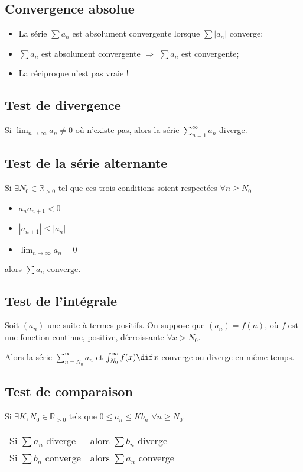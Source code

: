 \subsection{Convergence absolue}
\begin{itemize}
  \item
    La série $\sum a_n$ est absolument convergente
    lorsque $\sum |a_n|$ converge;
  \item
    $\sum a_n$ est absolument convergente
    $\Rightarrow$ $\sum a_n$ est convergente;
  \item
    La réciproque n'est pas vraie !
\end{itemize}

\subsection{Test de divergence}
Si $\lim_{n \to \infty}a_n \neq 0$ où n'existe pas,
alors la série $\sum_{n = 1}^{\infty}a_n$ diverge.

\subsection{Test de la série alternante}
Si $\exists N_0 \in \mathbb{R}_{> 0}$ tel que
ces trois conditions soient respectées
$\forall n \geq N_0$
\begin{itemize}
  \item $a_na_{n+1} < 0$
  \item $|a_{n+1}| \leq |a_{n}|$
  \item $\lim_{n\to\infty}a_n = 0$
\end{itemize}
alors $\sum a_n$ converge.

\subsection{Test de l'intégrale}
Soit $(a_n)$ une suite à termes positifs.
On suppose que $(a_n) = f(n)$, où $f$ est une fonction continue,
positive, décroissante $\forall x > N_0$.

Alors la série $\sum_{n =N_0}^{\infty} a_n$ et
$\int_{N_0}^{\infty} f(x) \dif x$ converge ou diverge en même temps.

\subsection{Test de comparaison}
Si $\exists K, N_0 \in \mathbb{R}_{> 0}$ tels que
$0 \leq a_n \leq Kb_n$ $\forall n \geq N_0$.
\begin{center}
  \begin{tabular}{ll}
    Si $\sum a_n$ diverge & alors $\sum b_n$ diverge\\
    Si $\sum b_n$ converge & alors $\sum a_n$ converge
  \end{tabular}
\end{center}

